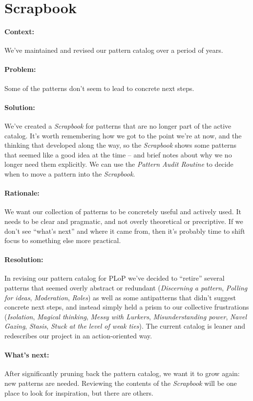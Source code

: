 \section{Scrapbook}

\paragraph{Context:} We've maintained and revised our pattern catalog over a period of years.
\paragraph{Problem:} Some of the patterns don't seem to lead to concrete next steps.
\paragraph{Solution:} We've created a \emph{Scrapbook} for patterns that are no longer part of the active catalog.  It's worth remembering how we got to the point we're at now, and the thinking that developed along the way, so the \emph{Scrapbook} shows some patterns that seemed like a good idea at the time -- and brief notes about why we no longer need them explicitly.  We can use the \emph{Pattern Audit Routine} to decide when to move a pattern into the \emph{Scrapbook}.
\paragraph{Rationale:} We want our collection of patterns to be concretely useful and actively used.  It needs to be clear and pragmatic, and not overly theoretical or precriptive.  If we don't see ``what's next'' and where it came from, then it's probably time to shift focus to something else more practical.
\paragraph{Resolution:}  In revising our pattern catalog for PLoP we've decided to ``retire'' several patterns that seemed overly abstract or redundant (\emph{Discerning a pattern}, \emph{Polling for ideas}, \emph{Moderation}, \emph{Roles}) as well as some antipatterns that didn't suggest concrete next steps, and instead simply held a prism to our collective frustrations (\emph{Isolation}, \emph{Magical thinking}, \emph{Messy with Lurkers}, \emph{Misunderstanding power}, \emph{Navel Gazing}, \emph{Stasis}, \emph{Stuck at the level of weak ties}).  The current catalog is leaner and redescribes our project in an action-oriented way. 
\paragraph{What's next:} After significantly pruning back the pattern catalog, we want it to grow again: new patterns are needed.  Reviewing the contents of the \emph{Scrapbook} will be one place to look for inspiration, but there are others.

